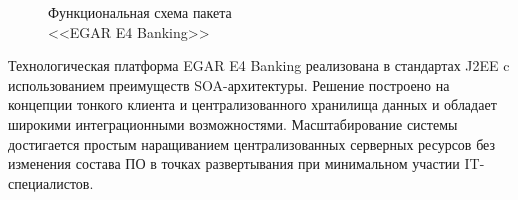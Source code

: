 \begin{figure}[h!]
  \centering
  \caption{Функциональная схема пакета \\ <<EGAR E4 Banking>>}
  \label{fig:egar_structure}
\end{figure}

Технологическая платформа EGAR E4 Banking реализована в стандартах J2EE
c использованием преимуществ SOA-архитектуры.
Решение построено на концепции тонкого клиента и централизованного хранилища данных
и обладает широкими интеграционными возможностями.
Масштабирование системы достигается простым наращиванием централизованных
серверных ресурсов без изменения состава ПО в точках развертывания
при минимальном участии IT-специалистов.